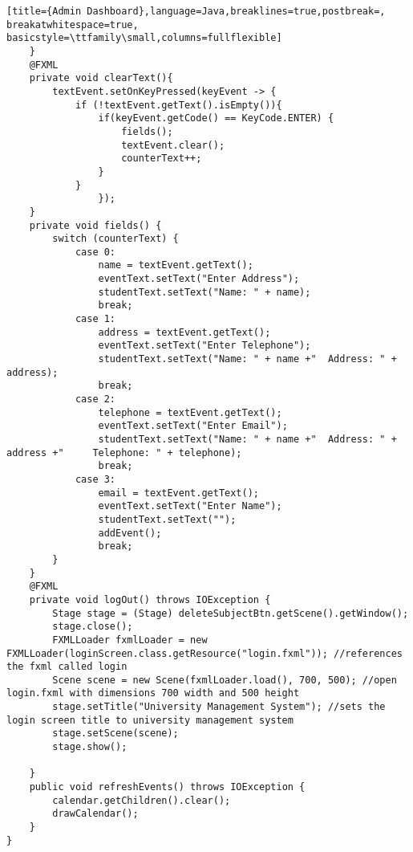 \begin{lstlisting}[title={Admin Dashboard},language=Java,breaklines=true,postbreak=, breakatwhitespace=true, basicstyle=\ttfamily\small,columns=fullflexible]
    }
    @FXML
    private void clearText(){
        textEvent.setOnKeyPressed(keyEvent -> {
            if (!textEvent.getText().isEmpty()){
                if(keyEvent.getCode() == KeyCode.ENTER) {
                    fields();
                    textEvent.clear();
                    counterText++;
                }
            }
                });
    }
    private void fields() {
        switch (counterText) {
            case 0:
                name = textEvent.getText();
                eventText.setText("Enter Address");
                studentText.setText("Name: " + name);
                break;
            case 1:
                address = textEvent.getText();
                eventText.setText("Enter Telephone");
                studentText.setText("Name: " + name +"  Address: " + address);
                break;
            case 2:
                telephone = textEvent.getText();
                eventText.setText("Enter Email");
                studentText.setText("Name: " + name +"  Address: " + address +"     Telephone: " + telephone);
                break;
            case 3:
                email = textEvent.getText();
                eventText.setText("Enter Name");
                studentText.setText("");
                addEvent();
                break;
        }
    }
    @FXML
    private void logOut() throws IOException {
        Stage stage = (Stage) deleteSubjectBtn.getScene().getWindow();
        stage.close();
        FXMLLoader fxmlLoader = new FXMLLoader(loginScreen.class.getResource("login.fxml")); //references the fxml called login
        Scene scene = new Scene(fxmlLoader.load(), 700, 500); //open login.fxml with dimensions 700 width and 500 height
        stage.setTitle("University Management System"); //sets the login screen title to university management system
        stage.setScene(scene);
        stage.show();

    }
    public void refreshEvents() throws IOException {
        calendar.getChildren().clear();
        drawCalendar();
    }
}
\end{lstlisting}

















